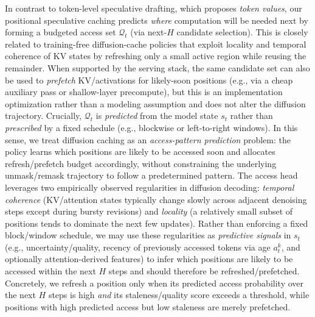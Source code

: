 \documentclass[11pt]{article}
\newcommand{\cQ}{\mathcal{Q}}
\begin{document}
In contrast to token-level speculative drafting, which proposes \emph{token values}, our positional
speculative caching predicts \emph{where} computation will be needed next by forming a budgeted access
set $\cQ_t$ (via next-$H$ candidate selection). This is closely related to training-free diffusion-cache
policies that exploit locality and temporal coherence of KV states by refreshing only a small active
region while reusing the remainder. When supported by the serving stack, the same candidate set
can also be used to \emph{prefetch} KV/activations for likely-soon positions (e.g., via a cheap auxiliary
pass or shallow-layer precompute), but this is an implementation optimization rather than a modeling
assumption and does not alter the diffusion trajectory.
Crucially, $\cQ_t$ is \emph{predicted} from the model state $s_t$  rather than
\emph{prescribed} by a fixed schedule (e.g., blockwise or left-to-right windows). In this sense, we treat
diffusion caching as an \emph{access-pattern prediction} problem: the policy learns which positions are
likely to be accessed soon and allocates refresh/prefetch budget accordingly, without constraining the
underlying unmask/remask trajectory to follow a predetermined pattern.
The access head leverages two empirically observed regularities in diffusion decoding: \emph{temporal coherence}
(KV/attention states typically change slowly across adjacent denoising steps except during bursty revisions)
and \emph{locality} (a relatively small subset of positions tends to dominate the next few updates).
Rather than enforcing a fixed block/window schedule, we may use these regularities as \emph{predictive signals} in $s_t$
(e.g., uncertainty/quality, recency of previously accessed tokens via age $a_t^k$, and optionally attention-derived features) to infer
which positions are likely to be accessed within the next $H$ steps and should therefore be refreshed/prefetched. Concretely, we refresh a position only when its predicted access probability over the next $H$ steps is high \emph{and} its staleness/quality score exceeds a threshold, while positions with high predicted access but low staleness are merely prefetched.
\end{document}
